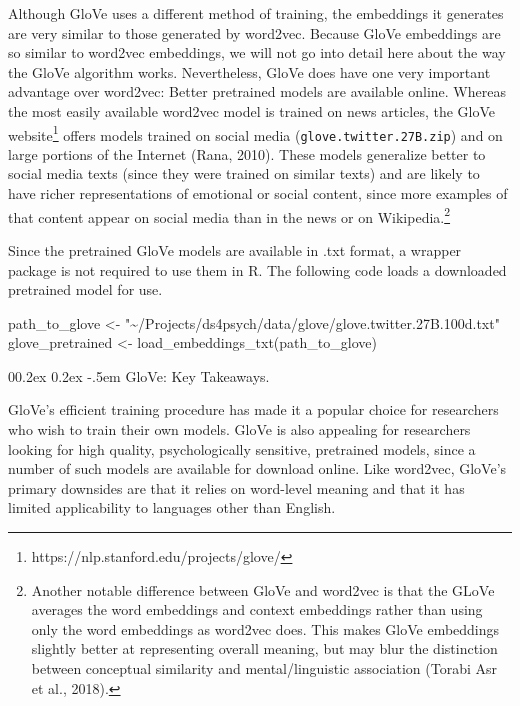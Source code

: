 \documentclass[
  man,
  floatsintext,
  longtable,
  nolmodern,
  notxfonts,
  notimes,
  colorlinks=true,linkcolor=blue,citecolor=blue,urlcolor=blue]{apa7}
\makeatletter
\renewcommand{\paragraph}{\@startsection{paragraph}{4}{\parindent}%
	{0\baselineskip \@plus 0.2ex \@minus 0.2ex}%
	{-.5em}%
	{\normalfont\normalsize\bfseries\typesectitle}}
\newenvironment{Shaded}{\begin{snugshade}}{\end{snugshade}}
\newcommand{\FunctionTok}[1]{\textcolor[rgb]{0.28,0.35,0.67}{#1}}
\newcommand{\NormalTok}[1]{\textcolor[rgb]{0.00,0.23,0.31}{#1}}
\newcommand{\OtherTok}[1]{\textcolor[rgb]{0.00,0.23,0.31}{#1}}
\newcommand{\StringTok}[1]{\textcolor[rgb]{0.13,0.47,0.30}{#1}}
\makeatother
\begin{document}
Although GloVe uses a different method of training, the embeddings it
generates are very similar to those generated by word2vec. Because GloVe
embeddings are so similar to word2vec embeddings, we will not go into
detail here about the way the GloVe algorithm works. Nevertheless, GloVe
does have one very important advantage over word2vec: Better pretrained
models are available online. Whereas the most easily available word2vec
model is trained on news articles, the GloVe website\footnote{https://nlp.stanford.edu/projects/glove/}
offers models trained on social media (\texttt{glove.twitter.27B.zip})
and on large portions of the Internet (Rana, 2010). These models
generalize better to social media texts (since they were trained on
similar texts) and are likely to have richer representations of
emotional or social content, since more examples of that content appear
on social media than in the news or on Wikipedia.\footnote{Another
  notable difference between GloVe and word2vec is that the GLoVe
  averages the word embeddings and context embeddings rather than using
  only the word embeddings as word2vec does. This makes GloVe embeddings
  slightly better at representing overall meaning, but may blur the
  distinction between conceptual similarity and mental/linguistic
  association (Torabi Asr et al., 2018).}

Since the pretrained GloVe models are available in .txt format, a
wrapper package is not required to use them in R. The following code
loads a downloaded pretrained model for use.

\begin{Shaded}
\begin{Highlighting}[]
\NormalTok{path\_to\_glove }\OtherTok{\textless{}{-}} \StringTok{"\textasciitilde{}/Projects/ds4psych/data/glove/glove.twitter.27B.100d.txt"}
\NormalTok{glove\_pretrained }\OtherTok{\textless{}{-}} \FunctionTok{load\_embeddings\_txt}\NormalTok{(path\_to\_glove)}
\end{Highlighting}
\end{Shaded}

\paragraph{GloVe: Key Takeaways.}\label{glove-key-takeaways}

GloVe's efficient training procedure has made it a popular choice for
researchers who wish to train their own models. GloVe is also appealing
for researchers looking for high quality, psychologically sensitive,
pretrained models, since a number of such models are available for
download online. Like word2vec, GloVe's primary downsides are that it
relies on word-level meaning and that it has limited applicability to
languages other than English.
\end{document}

